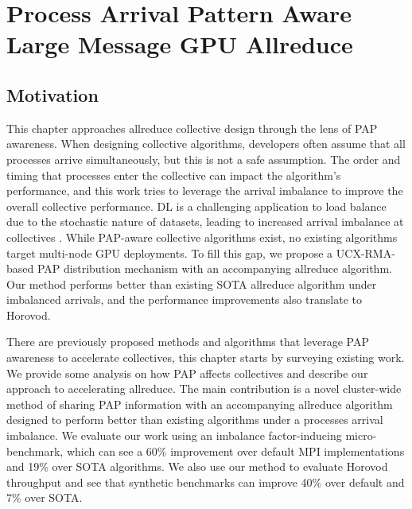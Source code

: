 
\chapter[Process Arrival Pattern Aware Large Message GPU Allreduce]{Process Arrival Pattern Aware Large Message GPU Allreduce}\label{ch:CH5-PAPAwareness}

\section{Motivation}
This chapter approaches allreduce collective design through the lens of \gls{PAP} awareness.
When designing collective algorithms, developers often assume that all processes arrive simultaneously, but this is not a safe assumption.
The order and timing that processes enter the collective can impact the algorithm's performance, and this work tries to leverage the arrival imbalance to improve the overall collective performance.
\gls{DL} is a challenging application to load balance due to the stochastic nature of datasets, leading to increased arrival imbalance at collectives \cite{Mohammadalizadehbakhtevari2021Thesis, Alizadeh2022PAPCollDL, Li2020DLPartialColl}. 
While \gls{PAP}-aware collective algorithms exist, no existing algorithms target multi-node \gls{GPU} deployments. 
To fill this gap, we propose a \gls{UCX}-\gls{RMA}-based \gls{PAP} distribution mechanism with an accompanying allreduce algorithm.
Our method performs better than existing \gls{SOTA} allreduce algorithm under imbalanced arrivals, and the performance improvements also translate to Horovod.

There are previously proposed methods and algorithms that leverage \gls{PAP} awareness to accelerate collectives, this chapter starts by surveying existing work.
We provide some analysis on how \gls{PAP} affects collectives and describe our approach to accelerating allreduce.
The main contribution is a novel cluster-wide method of sharing \gls{PAP} information with an accompanying allreduce algorithm designed to perform better than existing algorithms under a processes arrival imbalance.
We evaluate our work using an imbalance factor-inducing micro-benchmark, which can see a 60\% improvement over default \gls{MPI} implementations and 19\% over \gls{SOTA} algorithms.
We also use our method to evaluate Horovod throughput and see that synthetic benchmarks can improve 40\% over default and 7\% over \gls{SOTA}.

